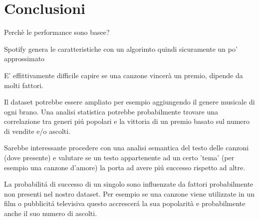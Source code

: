 \chapter{Conclusioni}

Perchè le performance sono basee?

Spotify genera le caratteristiche con un algorimto quindi sicuramente un po' approssimato

E' effittivamente difficile capire se una canzone vincerà un premio, dipende da molti fattori.

Il dataset potrebbe essere ampliato per esempio aggiungendo il genere
musicale di ogni brano. Una analisi statistica potrebbe probabilmente
trovare una correlazione tra generi piú popolari e la vittoria di un
premio basato sul numero di vendite e/o ascolti.

Sarebbe interessante procedere con una analisi semantica del testo
delle canzoni (dove presente) e valutare se un testo appartenente ad
un certo 'tema' (per esempio una canzone d'amore) la porta ad avere
piú successo rispetto ad altre.

La probabilitá di successo di un singolo sono influenzate da fattori
probabilmente non presenti nel nostro dataset. Per esempio se una
canzone viene utilizzate in un film o pubblicitá televisiva questo
accrescerá la sua popolarità e probabilmente anche il suo numero di
ascolti.
